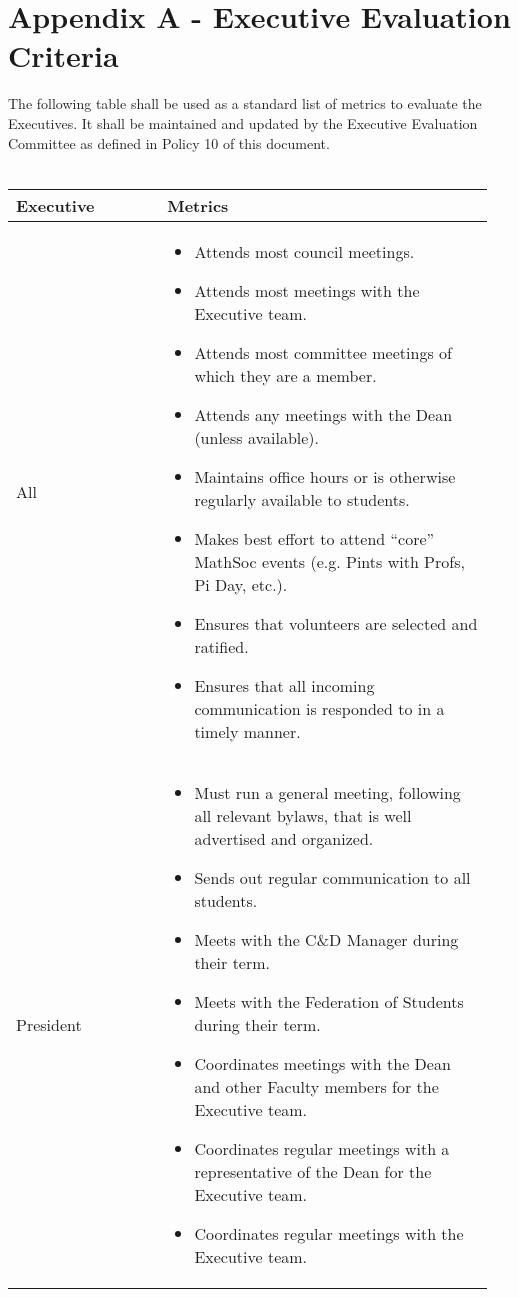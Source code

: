 \section{Appendix A - Executive Evaluation Criteria}

The following table shall be used as a standard list of metrics to evaluate the Executives. It shall be maintained and updated by the Executive Evaluation Committee as defined in Policy 10 of this document.\\
\\
\begin{longtable}{p{0.3\linewidth} p{0.65\linewidth}}
\toprule
Executive & Metrics\\
\midrule
All &
\begin{itemize}
\item Attends most council meetings.
\item Attends most meetings with the Executive team.
\item Attends most committee meetings of which they are a member.
\item Attends any meetings with the Dean (unless available).
\item Maintains office hours or is otherwise regularly available to students.
\item Makes best effort to attend “core” MathSoc events (e.g. Pints with Profs, Pi Day, etc.).
\item Ensures that volunteers are selected and ratified.
\item Ensures that all incoming communication is responded to in a timely manner.
\end{itemize}
\\
\midrule
President &
\begin{itemize}
\item Must run a general meeting, following all relevant bylaws, that is well advertised and organized.
\item Sends out regular communication to all students.
\item Meets with the C\&D Manager during their term.
\item Meets with the Federation of Students during their term.
\item Coordinates meetings with the Dean and other Faculty members for
the Executive team.
\item Coordinates regular meetings with a representative of the Dean for the
Executive team.
\item Coordinates regular meetings with the Executive team.

\end{itemize}
\end{longtable}
